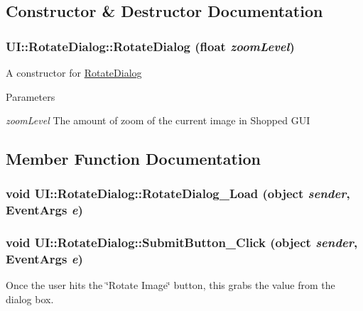 \subsection{Constructor \& Destructor Documentation}
\hypertarget{class_u_i_1_1_rotate_dialog_a6bc941e68844f6663d1c76e3bb93dfdd}{
\subsubsection[{RotateDialog}]{\setlength{\rightskip}{0pt plus 5cm}UI::RotateDialog::RotateDialog (float {\em zoomLevel})}}
\label{class_u_i_1_1_rotate_dialog_a6bc941e68844f6663d1c76e3bb93dfdd}
A constructor for \hyperlink{class_u_i_1_1_rotate_dialog}{RotateDialog}


\begin{DoxyParams}{Parameters}
\item[{\em zoomLevel}]The amount of zoom of the current image in Shopped GUI \end{DoxyParams}


\subsection{Member Function Documentation}
\hypertarget{class_u_i_1_1_rotate_dialog_a81382e5dea746430a971d60d9c7d4ab5}{
\subsubsection[{RotateDialog\_\-Load}]{\setlength{\rightskip}{0pt plus 5cm}void UI::RotateDialog::RotateDialog\_\-Load (object {\em sender}, \/  EventArgs {\em e})}}
\label{class_u_i_1_1_rotate_dialog_a81382e5dea746430a971d60d9c7d4ab5}
\hypertarget{class_u_i_1_1_rotate_dialog_ac7b57eb47857579ea2ee9be19d92c032}{
\subsubsection[{SubmitButton\_\-Click}]{\setlength{\rightskip}{0pt plus 5cm}void UI::RotateDialog::SubmitButton\_\-Click (object {\em sender}, \/  EventArgs {\em e})}}
\label{class_u_i_1_1_rotate_dialog_ac7b57eb47857579ea2ee9be19d92c032}
Once the user hits the \char`\"{}Rotate Image\char`\"{} button, this grabs the value from the dialog box. 


